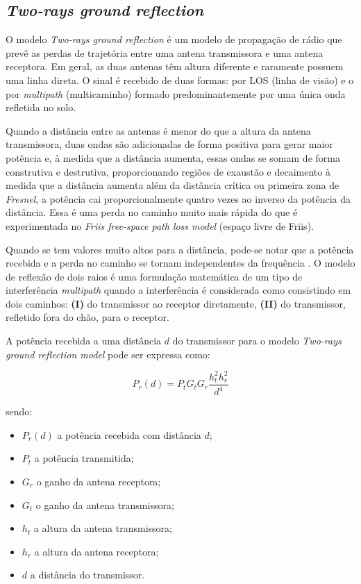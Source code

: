 \documentclass[
	12pt,				%
	twoside,			%
	a4paper,			%
	english,			%
	french,				%
	spanish,			%
	brazil				%
	]{abntex2}
\begin{document}
\subsection{\texorpdfstring{\emph{Two-rays ground
reflection}}{Two-rays ground reflection}}\label{sec:two_rays}

O modelo \emph{Two-rays ground reflection} é um modelo de propagação de
rádio que prevê as perdas de trajetória entre uma antena transmissora e
uma antena receptora. Em geral, as duas antenas têm altura diferente e
raramente possuem uma linha direta\cite{LUO}. O sinal é recebido de duas
formas: por LOS (linha de visão) e o por \emph{multipath} (multicaminho)
formado predominantemente por uma única onda refletida no solo.

Quando a distância entre as antenas é menor do que a altura da antena
transmissora, duas ondas são adicionadas de forma positiva para gerar
maior potência e, à medida que a distância aumenta, essas ondas se somam
de forma construtiva e destrutiva, proporcionando regiões de exaustão e
decaimento à medida que a distância aumenta além da distância crítica ou
primeira zona de \emph{Fresnel}, a potência cai proporcionalmente quatro
vezes ao inverso da potência da distância. Essa é uma perda no caminho
muito mais rápida do que é experimentada no \emph{Friis free-space path
loss model} (espaço livre de Friis).

Quando se tem valores muito altos para a distância, pode-se notar que a
potência recebida e a perda no caminho se tornam independentes da
frequência \cite{RAPPAPORT}. O modelo de reflexão de dois raios é uma
formulação matemática de um tipo de interferência \emph{multipath}
quando a interferência é considerada como consistindo em dois caminhos:
\textbf{(I)} do transmissor ao receptor diretamente, \textbf{(II)} do
transmissor, refletido fora do chão, para o receptor.

A potência recebida a uma distância \(d\) do transmissor para o modelo
\emph{Two-rays ground reflection model} pode ser expressa como:

\begin{equation}
    P_{r}(d) = P_{t}G_{t}G_{r}\frac{h^{2}_{t}h^{2}_{r}}{d^{4}}
\end{equation}

sendo:

\begin{itemize}
\item
  \(P_{r}(d)\) a potência recebida com distância \(d\);
\item
  \(P_{t}\) a potência transmitida;
\item
  \(G_{r}\) o ganho da antena receptora;
\item
  \(G_{t}\) o ganho da antena transmissora;
\item
  \(h_{t}\) a altura da antena transmissora;
\item
  \(h_{r}\) a altura da antena receptora;
\item
  \(d\) a distância do transmissor.
\end{itemize}
\end{document}
